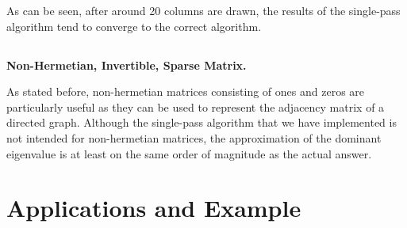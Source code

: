 \documentclass[11pt]{amsart}
\begin{document}


As can be seen, after around 20 columns are drawn, the results of the single-pass algorithm tend to converge to the correct algorithm.

\subsection{}\textbf{Non-Hermetian, Invertible, Sparse Matrix.}

As stated before, non-hermetian matrices consisting of ones and zeros are particularly useful as they can be used to represent the adjacency matrix of a directed graph. Although the single-pass algorithm that we have implemented is not intended for non-hermetian matrices, the approximation of the dominant eigenvalue is at least on the same order of magnitude as the actual answer.



\section{Applications and Example}

\end{document}
